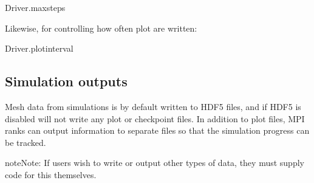 \documentclass[letterpaper,10pt,english]{sphinxmanual}
\begin{document}
\begin{sphinxVerbatim}[commandchars=\\\{\},formatcom=\scriptsize]
Driver.max\PYGZus{}steps  
\end{sphinxVerbatim}

Likewise, for controlling how often plot are written:

\begin{sphinxVerbatim}[commandchars=\\\{\},formatcom=\scriptsize]
Driver.plot\PYGZus{}interval  
\end{sphinxVerbatim}


\subsection{Simulation outputs}
\label{\detokenize{Base/Control:simulation-outputs}}
Mesh data from  simulations is by default written to HDF5 files, and if HDF5 is disabled  will not write any plot or checkpoint files.
In addition to plot files, MPI ranks can output information to separate files so that the simulation progress can be tracked.

\begin{sphinxadmonition}{note}{Note:}
If users wish to write or output other types of data, they must supply code for this themselves.
\end{sphinxadmonition}
\end{document}
